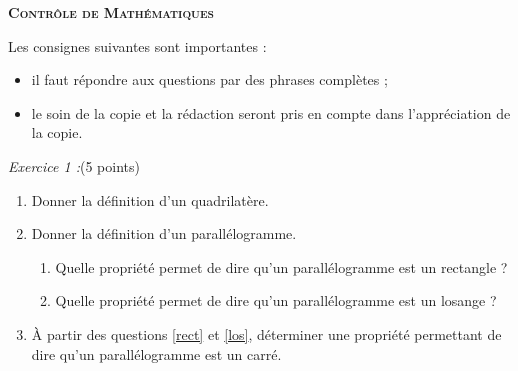 \documentclass[12pt,french]{article}
\begin{document}
\begin{center}
    \scshape\bfseries Contrôle de Mathématiques
\end{center}\bigskip

Les consignes suivantes sont importantes :
\begin{itemize}
    \item il faut répondre aux questions par des phrases complètes ;
    \item le soin de la copie et la rédaction seront pris en compte dans l'appréciation de la copie.
\end{itemize}\bigskip

\textit{Exercice 1 :}\hfill (5 points)

\begin{enumerate}
    \item Donner la définition d'un quadrilatère.
    \item Donner la définition d'un parallélogramme.
        \begin{enumerate}
            \item Quelle propriété permet de dire qu'un parallélogramme est un rectangle ?\label{rect}
            \item Quelle propriété permet de dire qu'un parallélogramme est un losange ?\label{los}
        \end{enumerate}
    \item À partir des questions \ref{rect} et \ref{los}, déterminer une propriété permettant de dire qu'un parallélogramme est un carré.
\end{enumerate}
\end{document}
